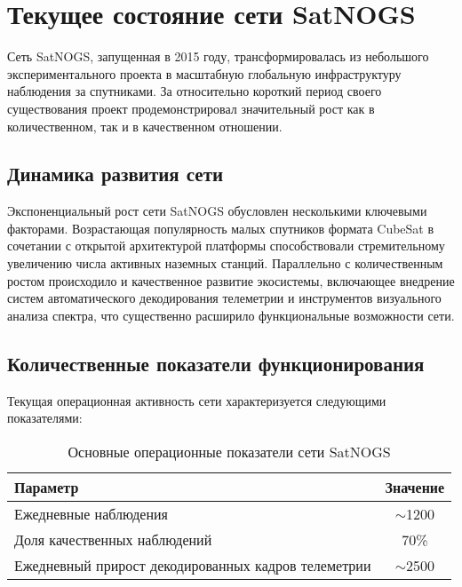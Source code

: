 \section{Текущее состояние сети SatNOGS}

Сеть SatNOGS, запущенная в 2015 году, трансформировалась из небольшого
экспериментального проекта в масштабную глобальную инфраструктуру наблюдения за
спутниками. За относительно короткий период своего существования проект
продемонстрировал значительный рост как в количественном, так и в качественном
отношении.

\subsection{Динамика развития сети}

Экспоненциальный рост сети SatNOGS обусловлен несколькими ключевыми факторами.
Возрастающая популярность малых спутников формата CubeSat в сочетании с
открытой архитектурой платформы способствовали стремительному увеличению числа
активных наземных станций. Параллельно с количественным ростом происходило и
качественное развитие экосистемы, включающее внедрение систем автоматического
декодирования телеметрии и инструментов визуального анализа спектра, что
существенно расширило функциональные возможности сети.

\subsection{Количественные показатели функционирования}

Текущая операционная активность сети характеризуется следующими показателями:

\begin{table}[htbp]
	\centering
	\begin{tabular}{|l|c|}
		\hline
		\textbf{Параметр}                                   & \textbf{Значение} \\
		\hline
		Ежедневные наблюдения                               & $\sim$1200        \\
		Доля качественных наблюдений                        & 70\%              \\
		Ежедневный прирост декодированных кадров телеметрии & $\sim$2500        \\
		\hline
	\end{tabular}
	\caption{Основные операционные показатели сети SatNOGS}
	\label{tab:satnogs_stats}
\end{table}

